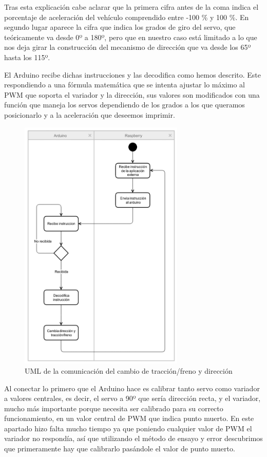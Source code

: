 \documentclass{pclass}
\begin{document}
\begin{itemize}
\begin{itemize}
	Tras esta explicación cabe aclarar que la primera cifra antes de la coma indica el porcentaje de aceleración del vehículo comprendido entre -100 \% y 100 \%. En segundo lugar aparece la cifra que indica los grados de giro del servo, que teóricamente va desde 0º a 180º, pero que en nuestro caso está limitado a lo que nos deja girar la construcción del mecanismo de dirección que va desde los 65º hasta los 115º.
	

	El Arduino recibe dichas instrucciones y las decodifica como hemos descrito. Este respondiendo a una fórmula matemática que se intenta ajustar lo máximo al PWM que soporta el variador y la dirección, sus valores son modificados con una función que maneja los servos dependiendo de los grados a los que queramos posicionarlo y a la aceleración que deseemos imprimir.
	
	\begin{figure}[H]
		\centering
		\includegraphics[width=0.7\textwidth]{img/umlCambio}
		\caption{UML de la comunicación del cambio de tracción/freno y dirección}
		\label{fig:arduinoCambios}
	\end{figure}
	
	Al conectar lo primero que el Arduino hace es calibrar tanto servo como variador a valores centrales, es decir, el servo a 90º que sería dirección recta, y el variador, mucho más importante porque necesita ser calibrado para su correcto funcionamiento, en un valor central de PWM que indica punto muerto. En este apartado hizo falta mucho tiempo ya que poniendo cualquier valor de PWM el variador no respondía, así que utilizando el método de ensayo y error descubrimos que primeramente hay que calibrarlo pasándole el valor de punto muerto.
	

\end{itemize}
\end{itemize}
\end{document}
